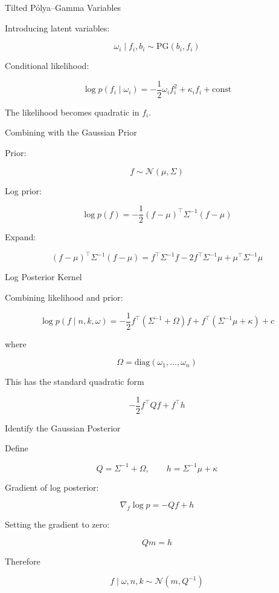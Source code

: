 \documentclass[11pt]{beamer}
\begin{document}
\begin{frame}{Tilted Pólya--Gamma Variables}

Introducing latent variables:

\[
\omega_i \mid f_i,b_i
\sim
\text{PG}(b_i,f_i)
\]

Conditional likelihood:

\[
\log p(f_i \mid \omega_i)
=
-\frac12 \omega_i f_i^2
+ 
\kappa_i f_i
+
\text{const}
\]

The likelihood becomes quadratic in $f_i$.

\end{frame}

\begin{frame}{Combining with the Gaussian Prior}

Prior:

\[
f \sim \mathcal{N}(\mu,\Sigma)
\]

Log prior:

\[
\log p(f)
=
-\frac12 (f-\mu)^\top
\Sigma^{-1}
(f-\mu)
\]

Expand:

\[
(f-\mu)^\top\Sigma^{-1}(f-\mu)
=
f^\top\Sigma^{-1}f
-2f^\top\Sigma^{-1}\mu
+
\mu^\top\Sigma^{-1}\mu
\]

\end{frame}

\begin{frame}{Log Posterior Kernel}

Combining likelihood and prior:

\[
\log p(f\mid n,k,\omega)
=
-\frac12 f^\top(\Sigma^{-1}+\Omega)f
+
f^\top(\Sigma^{-1}\mu+\kappa)
+
c
\]

where

\[
\Omega = \text{diag}(\omega_1,\dots,\omega_n)
\]

This has the standard quadratic form

\[
-\frac12 f^\top Q f + f^\top h
\]

\end{frame}

\begin{frame}{Identify the Gaussian Posterior}

Define

\[
Q = \Sigma^{-1}+\Omega,
\qquad
h = \Sigma^{-1}\mu+\kappa
\]

Gradient of log posterior:

\[
\nabla_f \log p
=
-Qf + h
\]

Setting the gradient to zero:

\[
Qm = h
\]

Therefore

\[
f \mid \omega,n,k
\sim
\mathcal{N}(m,Q^{-1})
\]

\end{frame}
\end{document}
